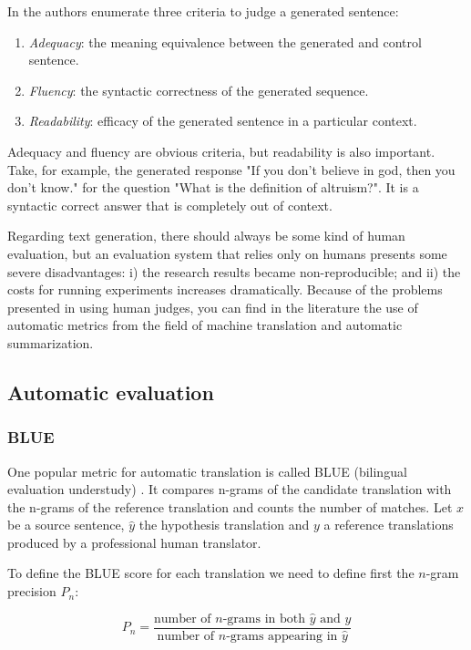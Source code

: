 In \cite{Stent} the authors enumerate three criteria to judge a generated sentence:

\begin{enumerate}
\item \textit{Adequacy}: the meaning equivalence between the generated and control sentence. 
\item \textit{Fluency}: the syntactic correctness of the generated sequence.
\item \textit{Readability}: efficacy of the generated sentence in a particular context.
\end{enumerate}

Adequacy and fluency are obvious criteria, but readability is also important. Take, for example, the generated response "If you don’t believe in god, then you don’t know." for the question "What is the definition of altruism?". It is a syntactic correct answer that is completely out of context.

Regarding text generation, there should always be some kind of human evaluation, but an evaluation system that relies only on humans presents some severe disadvantages: i) the research results became non-reproducible; and ii) the costs for running experiments increases dramatically. Because of the problems presented in using human judges, you can find in the literature the use of automatic metrics from the field of machine translation and automatic summarization.


\subsection{Automatic evaluation}

\subsubsection{BLUE}

One popular metric for automatic translation is called BLUE (bilingual evaluation understudy) \cite{Papineni2001}. It compares n-grams of the candidate translation with the n-grams of the reference translation and counts the number of matches. Let $x$ be a source sentence, $\hat{y}$ the hypothesis translation and $y$ a reference translations produced by a professional human translator. 

To define the BLUE score for each translation we need to define first the $n$-gram precision $P_n$:

\begin{equation}
P_n = \frac{\text{number of } n\text{-grams in both } \hat{y} \text{ and } y}{\text{number of } n\text{-grams appearing in } \hat{y}}
\end{equation}    

